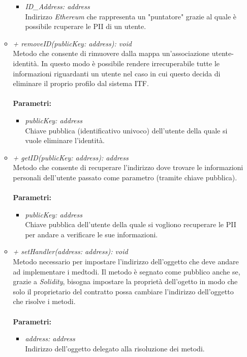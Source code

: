 \begin{itemize}
\begin{itemize}
\begin{itemize}
			\item \textit{ID\_Address: address}\\
			Indirizzo \textit{Ethereum} che rappresenta un "puntatore" grazie al quale è possibile rcuperare le \gls{PII} di un utente.
		\end{itemize}
		\item \textit{+ removeID(publicKey: address): void}\\
		Metodo che consente di rimuovere dalla mappa un'associazione utente-identità. In questo modo è possibile rendere irrecuperabile tutte le informazioni riguardanti un utente nel caso in cui questo decida di eliminare il proprio profilo dal sistema \gls{ITF}.\\\\
		\textbf{Parametri:}
		\begin{itemize}
			\item \textit{publicKey: address}\\
			Chiave pubblica (identificativo univoco) dell'utente della quale si vuole eliminare l'identità.
		\end{itemize}
		\item \textit{+ getID(publicKey: address): address}\\
		Metodo che consente di recuperare l'indirizzo dove trovare le informazioni personali dell'utente passato come parametro (tramite chiave pubblica).\\\\
		\textbf{Parametri:}
		\begin{itemize}
			\item \textit{publicKey: address}\\
			Chiave pubblica dell'utente della quale si vogliono recuperare le \gls{PII} per andare a verificare le sue informazioni.
		\end{itemize}
		\item \textit{+ setHandler(address: address): void}\\
		Metodo necessario per impostare l'indirizzo dell'oggetto che deve andare ad implementare i medtodi. Il metodo è segnato come pubblico anche se, grazie a \textit{Solidity}, bisogna impostare la proprietà dell'ogetto in modo che solo il proprietario del contratto possa cambiare l'indirizzo dell'oggetto che risolve i metodi.\\\\
		\textbf{Parametri:}
		\begin{itemize}
			\item \textit{address: address}\\
			Indirizzo dell'oggetto delegato alla risoluzione dei metodi.
		\end{itemize}
	\end{itemize}
\end{itemize}
